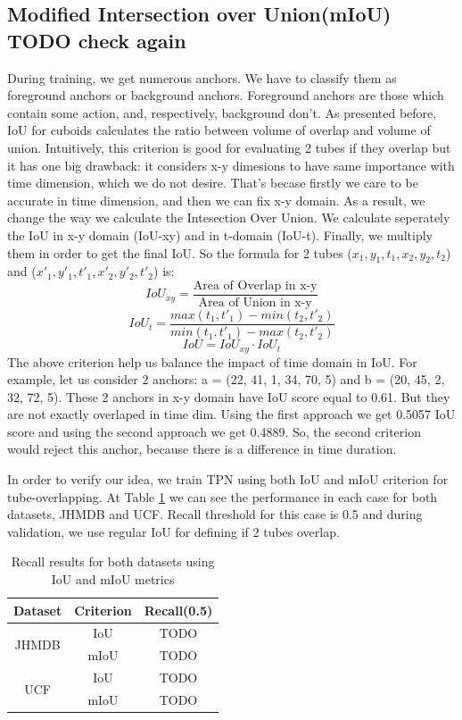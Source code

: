 \documentclass{report}
\begin{document}
\subsection{Modified Intersection over Union(mIoU) TODO check again} 
During training, we get numerous anchors. We have to classify them as foreground anchors or
background anchors. Foreground anchors are those which contain some action, and, respectively, background
don't. As presented before, IoU for cuboids calculates the ratio between volume of overlap and volume of
union.
Intuitively, this criterion is good for evaluating 2 tubes if they overlap but it has one big drawback:
it considers x-y dimesions to have same importance with time dimension, which we do not desire. That's becase
firstly we care to be accurate in time dimension, and then we can fix x-y domain.
As a result, we change the way we calculate the Intesection Over Union. We calculate seperately
the IoU in x-y domain (IoU-xy) and in t-domain (IoU-t). Finally, we multiply them in order to get the final IoU.
So the formula for 2 tubes ($x_1, y_1, t_1, x_2, y_2, t_2$) and ($x'_1, y'_1, t'_1, x'_2, y'_2, t'_2$) is:
\[ IoU_{xy} = \frac{ \text{Area of Overlap in x-y}} { \text{Area of Union in x-y}}  \]
\[ IoU_t = \frac { max(t_1, t'_1) - min(t_2, t'_2)} {min(t_1,t'_1) - max(t_2,t'_2)} \]
\[ IoU = IoU_{xy} \cdot  IoU_t \]
The above criterion help us balance the impact of time domain in IoU. For example, let us consider 2 anchors:
a = (22, 41, 1, 34, 70, 5) and b = (20, 45, 2, 32, 72, 5). These 2 anchors in x-y domain have IoU score equal to 0.61.
But they are not exactly overlaped in time dim. Using the first approach we get 0.5057 IoU score and using the
second approach we get 0.4889. So, the second criterion would reject this anchor, because there is a difference in time
duration.  \par

In order to verify our idea, we train TPN using both IoU and mIoU criterion for tube-overlapping. At Table \ref{table:iou_miou}
we can see the performance in each case for both datasets, JHMDB and UCF. Recall threshold for this case is 0.5 and during validation,
we use regular IoU for defining if 2 tubes overlap.
\begin{table}[h]
\centering
  \begin{tabular}{|| c | c | c ||}
    \hline
    \textbf{Dataset} & \textbf{Criterion} & \textbf{Recall(0.5)} \\
    \hline  \hline
    \multirow{2}{4em}{JHMDB} & IoU & TODO \\
    \cline{2-3}
    {} & mIoU & TODO \\
    \hline
    \multirow{2}{4em}{UCF} & IoU & TODO \\
    \cline{2-3}
    {} & mIoU & TODO \\
    \hline      
  \end{tabular}
  \caption{Recall results for both datasets using IoU and mIoU metrics}
  \label{table:iou_miou}
\end{table}
\end{document}
